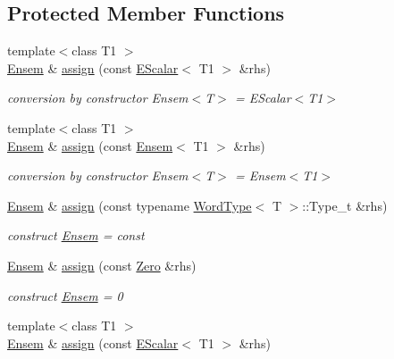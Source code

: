 \subsection*{Protected Member Functions}
\begin{DoxyCompactItemize}
\item 
{\footnotesize template$<$class T1 $>$ }\\\mbox{\hyperlink{classENSEM_1_1Ensem}{Ensem}} \& \mbox{\hyperlink{classENSEM_1_1Ensem_aa09448269bc5b72687905254739bf69a}{assign}} (const \mbox{\hyperlink{classENSEM_1_1EScalar}{E\+Scalar}}$<$ T1 $>$ \&rhs)
\begin{DoxyCompactList}\small\item\em conversion by constructor Ensem$<$\+T$>$ = E\+Scalar$<$\+T1$>$ \end{DoxyCompactList}\item 
{\footnotesize template$<$class T1 $>$ }\\\mbox{\hyperlink{classENSEM_1_1Ensem}{Ensem}} \& \mbox{\hyperlink{classENSEM_1_1Ensem_a43d968c090e5f6c518881cf7ff44d200}{assign}} (const \mbox{\hyperlink{classENSEM_1_1Ensem}{Ensem}}$<$ T1 $>$ \&rhs)
\begin{DoxyCompactList}\small\item\em conversion by constructor Ensem$<$\+T$>$ = Ensem$<$\+T1$>$ \end{DoxyCompactList}\item 
\mbox{\hyperlink{classENSEM_1_1Ensem}{Ensem}} \& \mbox{\hyperlink{classENSEM_1_1Ensem_ae31c239c3dc966eaad70ec90489f5476}{assign}} (const typename \mbox{\hyperlink{structENSEM_1_1WordType}{Word\+Type}}$<$ T $>$\+::Type\+\_\+t \&rhs)
\begin{DoxyCompactList}\small\item\em construct \mbox{\hyperlink{classENSEM_1_1Ensem}{Ensem}} = const \end{DoxyCompactList}\item 
\mbox{\hyperlink{classENSEM_1_1Ensem}{Ensem}} \& \mbox{\hyperlink{classENSEM_1_1Ensem_a140d8bb94d07a0abfb2ad396df63c625}{assign}} (const \mbox{\hyperlink{structENSEM_1_1Zero}{Zero}} \&rhs)
\begin{DoxyCompactList}\small\item\em construct \mbox{\hyperlink{classENSEM_1_1Ensem}{Ensem}} = 0 \end{DoxyCompactList}\item 
{\footnotesize template$<$class T1 $>$ }\\\mbox{\hyperlink{classENSEM_1_1Ensem}{Ensem}} \& \mbox{\hyperlink{classENSEM_1_1Ensem_aa09448269bc5b72687905254739bf69a}{assign}} (const \mbox{\hyperlink{classENSEM_1_1EScalar}{E\+Scalar}}$<$ T1 $>$ \&rhs)

\end{DoxyCompactItemize}
